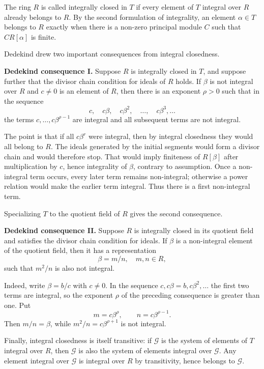 \documentclass[11pt]{article}
\begin{document}
The ring $R$ is called integrally closed in $T$ if every element of $T$ integral over $R$ already belongs to $R$. By the second formulation of integrality, an element $\alpha\in T$ belongs to $R$ exactly when there is a non-zero principal module $C$ such that $C R[\alpha]$ is finite.

Dedekind drew two important consequences from integral closedness.

\textbf{Dedekind consequence I.} Suppose $R$ is integrally closed in $T$, and suppose further that the divisor chain condition for ideals of $R$ holds. If $\beta$ is not integral over $R$ and $c\neq0$ is an element of $R$, then there is an exponent $\rho>0$ such that in the sequence
\[
  c,
  \quad c\beta,
  \quad c\beta^2,
  \quad \ldots,
  \quad c\beta^3,\ldots
\]
the terms $c,\ldots,c\beta^{\rho-1}$ are integral and all subsequent terms are not integral.

The point is that if all $c\beta^r$ were integral, then by integral closedness they would all belong to $R$. The ideals generated by the initial segments would form a divisor chain and would therefore stop. That would imply finiteness of $R[\beta]$ after multiplication by $c$, hence integrality of $\beta$, contrary to assumption. Once a non-integral term occurs, every later term remains non-integral; otherwise a power relation would make the earlier term integral. Thus there is a first non-integral term.

Specializing $T$ to the quotient field of $R$ gives the second consequence.

\textbf{Dedekind consequence II.} Suppose $R$ is integrally closed in its quotient field and satisfies the divisor chain condition for ideals. If $\beta$ is a non-integral element of the quotient field, then it has a representation
\[
  \beta=m/n,
  \quad m,n\in R,
\]
such that $m^2/n$ is also not integral.

Indeed, write $\beta=b/c$ with $c\neq0$. In the sequence $c,c\beta=b,c\beta^2,\ldots$ the first two terms are integral, so the exponent $\rho$ of the preceding consequence is greater than one. Put
\[
  m=c\beta^\rho,
  \qquad n=c\beta^{\rho-1}.
\]
Then $m/n=\beta$, while $m^2/n=c\beta^{\rho+1}$ is not integral.

Finally, integral closedness is itself transitive: if $\mathcal G$ is the system of elements of $T$ integral over $R$, then $\mathcal G$ is also the system of elements integral over $\mathcal G$. Any element integral over $\mathcal G$ is integral over $R$ by transitivity, hence belongs to $\mathcal G$.
\end{document}
